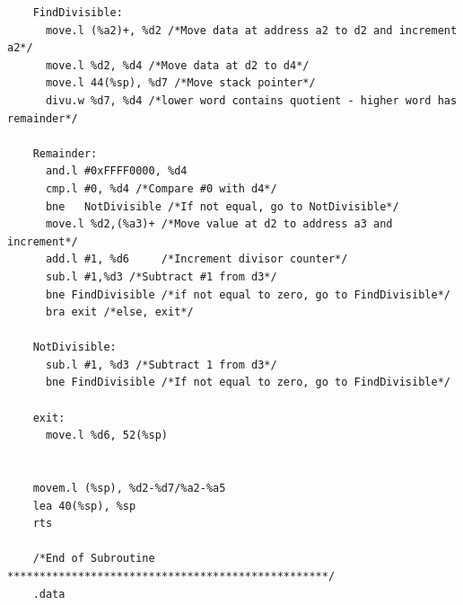 \documentclass[10pt, letterpaper, titlepage]{article} %
\begin{document}
\begin{lstlisting}
	FindDivisible:
	  move.l (%a2)+, %d2 /*Move data at address a2 to d2 and increment a2*/
	  move.l %d2, %d4 /*Move data at d2 to d4*/
	  move.l 44(%sp), %d7 /*Move stack pointer*/
	  divu.w %d7, %d4 /*lower word contains quotient - higher word has remainder*/
	
	Remainder:
	  and.l #0xFFFF0000, %d4
	  cmp.l	#0, %d4 /*Compare #0 with d4*/
	  bne	NotDivisible /*If not equal, go to NotDivisible*/
	  move.l %d2,(%a3)+ /*Move value at d2 to address a3 and increment*/
	  add.l #1, %d6		/*Increment divisor counter*/
	  sub.l #1,%d3 /*Subtract #1 from d3*/
	  bne FindDivisible /*if not equal to zero, go to FindDivisible*/
	  bra exit /*else, exit*/
	
	NotDivisible:
	  sub.l #1, %d3 /*Subtract 1 from d3*/
	  bne FindDivisible /*If not equal to zero, go to FindDivisible*/
	
	exit:
	  move.l %d6, 52(%sp)
	
	
	movem.l (%sp), %d2-%d7/%a2-%a5
	lea 40(%sp), %sp
	rts
	
	/*End of Subroutine **************************************************/
	.data
\end{lstlisting}

\newpage
\end{document}
